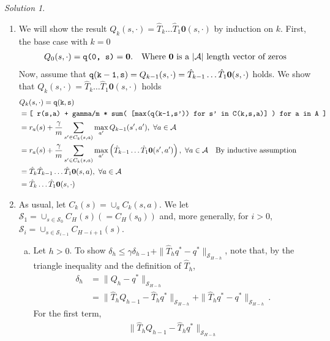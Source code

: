 \documentclass{article}
\newcommand{\norm}[1]{\| #1 \|}
\DeclareMathOperator*{\1}{\mathbbm{1}}
\newcommand{\0}{\mathbf{0}}
\theoremstyle{definition}
\theoremstyle{remark}
\newtheorem*{solution*}{Solution}
\newcommand{\cS}{\mathcal{S}}
\newcommand{\cA}{\mathcal{A}}
\begin{document}
\begin{solution*}
\mbox{}

\begin{enumerate}
\item We will show the result $Q_k(s,\cdot) = \hat T_k \dots \hat T_1 \0 (s,\cdot)$ by induction on $k$.
First, the base case with $k=0$
\begin{align*}
  & Q_0(s, \cdot) = \text{{\tt q(0, s)}} = \0. & \text{Where $\0$ is a $|\cA|$ length vector of zeros} \\
\end{align*}
Now, assume that ${\tt q(k-1, s)} = Q_{k-1}(s,\cdot) = \hat T_{k-1} \dots \hat T_1 \0 (s,\cdot)$ holds. We show that $Q_{k}(s,\cdot) = \hat T_{k} \dots \hat T_1 \0 (s,\cdot)$ holds
\begin{align*}
  & Q_{k}(s, \cdot) = \tt q(k, s) \\
  &= \text{\tt [ r(s,a) + gamma/m * sum( [max(q(k-1,s')) for s' in C(k,s,a)] ) for a in A ]} \\
  &= r_a(s) + \frac{\gamma}{m} \sum_{s' \in C_{k}(s,a)} \max_{a'} Q_{k-1}(s', a'), \ \forall a \in \cA \\
  &= r_a(s) + \frac{\gamma}{m} \sum_{s' \in C_{k}(s,a)} \max_{a'} \left( \hat T_{k-1} \dots \hat T_1 \0 (s', a') \right), \ \forall a \in \cA \quad \text{By inductive assumption} \\
  &= \hat T_k \hat T_{k-1} \dots \hat T_1 \0 (s, a), \ \forall a \in \cA \\
  &= \hat T_k \dots \hat T_1 \0 (s, \cdot)
\end{align*}
\item As usual, let $C_k(s) = \cup_a C_k(s,a)$.
We let $\cS_1 = \cup_{s\in \cS_0} C_H(s) (=C_H(s_0))$ and, more generally,
for $i>0$, 
 $\cS_i  = \cup_{s\in \cS_{i-1}} C_{H-i+1}(s)$.
\begin{enumerate}[(a)]
\item Let $h>0$. 
To show 
$\delta_h \le \gamma \delta_{h-1} + \norm{ \hat T_h q^* - q^* }_{\cS_{H-h}}$,
 note that, by the triangle inequality and the definition of $\hat T_h$,
 \begin{align*}
\delta_h 
& = \norm{Q_h-q^*}_{\cS_{H-h}}\\
& = \norm{ \hat T_h Q_{h-1}  - \hat T_h q^*}_{\cS_{H-h}} + 
       \norm{ \hat T_h q^* - q^*}_{\cS_{H-h}}\,.
\end{align*}
For the first term,
\begin{align*}
\norm{ \hat T_h  Q_{h-1} - \hat T_h q^*}_{\cS_{H-h}}

\end{align*}
\end{enumerate}
\end{enumerate}
\end{solution*}
\end{document}
